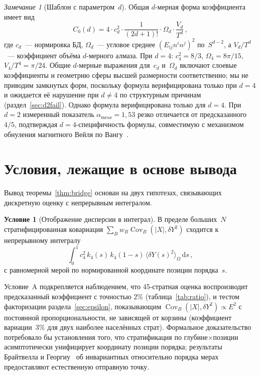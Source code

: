 \documentclass[12pt,a4paper]{article}
\theoremstyle{plain}
\theoremstyle{definition}
\newtheorem{condition}[theorem]{Условие}
\theoremstyle{remark}
\newtheorem{remark}[theorem]{Замечание}
\newcommand{\dd}{\mathrm{d}}
\newcommand{\Cov}{\operatorname{Cov}}
\begin{document}
\begin{remark}[Шаблон с параметром~$d$]
\label{rem:general-d}
Общая $d$-мерная форма коэффициента имеет вид
\begin{equation}\label{eq:general-d}
  C_0(d) = 4 \cdot c_d^2 \cdot \frac{1}{(2d+1)!}
  \cdot \Omega_d \cdot \frac{V_d}{T^d}\,,
\end{equation}
где $c_d$~--- нормировка БД, $\Omega_d$~--- угловое
среднее $(E_{ij}n^in^j)^2$ по~$S^{d-2}$, а $V_d/T^d$~---
коэффициент объёма $d$-мерного алмаза.  При $d = 4$:
$c_4^2 = 8/3$, $\Omega_4 = 8\pi/15$, $V_4/T^4 = \pi/24$.
Общие $d$-мерные выражения для~$c_d$ и~$\Omega_d$ включают
слоевые коэффициенты и геометрию сферы высшей размерности
соответственно; мы не приводим замкнутых форм, поскольку
формула верифицирована только при $d = 4$ и ожидается её
нарушение при $d \neq 4$ по структурным причинам
(раздел~\ref{sec:d2fail}).  Однако формула верифицирована
только для $d = 4$.  При $d = 2$ измеренный показатель
$\alpha_{\mathrm{meas}} = 1{,}53$ резко отличается от
предсказанного $4/5$, подтверждая $d = 4$-специфичность
формулы, совместимую с механизмом обнуления магнитного
Вейля по Вангу~\cite{Wang:2019}.
\end{remark}

\section{Условия, лежащие в основе вывода}
\label{sec:conditions}

Вывод теоремы~\ref{thm:bridge} основан на двух гипотезах,
связывающих дискретную оценку с непрерывным интегралом.

\begin{condition}[Отображение дисперсии в интеграл]
\label{cond:A}
В пределе больших~$N$ стратифицированная ковариация
$\sum_B w_B \Cov_B(|X|, \delta Y^2)$ сходится к
непрерывному интегралу
\begin{equation}\label{eq:condA}
  \int_0^1 c_4^2\, k_4(s)\, k_4(1-s)\,
  \langle \delta Y(s)^2 \rangle_\Omega\, \dd s\,,
\end{equation}
с равномерной мерой по нормированной координате
позиции порядка~$s$.
\end{condition}

Условие~A подкрепляется наблюдением, что 45-стратная
оценка воспроизводит предсказанный коэффициент с точностью
$2\%$ (таблица~\ref{tab:ratio}), и тестом факторизации
раздела~\ref{sec:epsilon}, показывающим
$\Cov_B(|X|, \delta Y^2) \propto E^2$ с постоянной
пропорциональности, не зависящей от корзины (коэффициент
вариации~$3\%$ для двух наиболее населённых страт).
Формальное доказательство потребовало бы установления того,
что стратификация по глубине$\times$позиции асимптотически
унифицирует координату позиции порядка; результаты Брайтвелла
и Георгиу~\cite{BrightwellLuczak:2011} об инвариантных
относительно порядка мерах предоставляют естественную
отправную точку.
\end{document}
